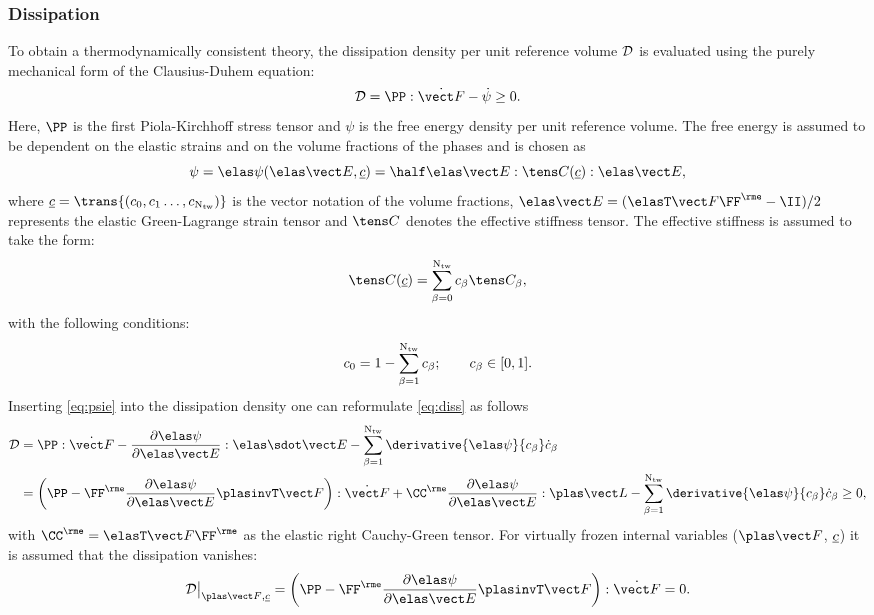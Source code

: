 \subsubsection{Dissipation} \label{sec:dissipation}
  To obtain a thermodynamically consistent theory, the  dissipation density per unit reference volume $\mathcal{D}$ is evaluated using the purely mechanical form of the Clausius-Duhem equation:
  \begin{equation}
      \diss = \PP : \FFdot - \psidot \geq 0.
      \label{eq:diss}
  \end{equation}
  Here, $\PP$ is the first Piola-Kirchhoff stress tensor and $\psi$ is the free energy density per unit reference volume. The free energy is assumed to be dependent on the elastic strains and on the volume fractions of the phases and is chosen as
  \begin{equation}
    \psi = \psie(\EEe, \cu)= \half \EEe : \CCCC(\cu) : \EEe,
    \label{eq:psie}
  \end{equation}
  where $\cu=\trans{(c_0, c_1 \ldots, c_{\Ntw})}$ is the vector notation of the volume fractions, \mbox{$\EEe=(\FFeT\FFe-\II)/2$} represents the elastic Green-Lagrange strain tensor and $\CCCC$ denotes the effective stiffness tensor.
  The effective stiffness is assumed to take the form:
  \begin{equation}
    \CCCC(\cu) = \sumbONtw \cb \CCCCb,
    \label{eq:CCCC}
  \end{equation}
  with the following conditions:
  \begin{equation}
    c_0 = 1- \sum_{\beta=1}^{{\rm N_{tw}}} c_{\beta}; \qquad c_{\beta} \in [0,1].
    \label{eq:c_constraints}
  \end{equation}
  Inserting \cref{eq:psie} into the dissipation density one can reformulate \cref{eq:diss} as follows
  \begin{equation}
    \begin{split}
      \diss &= \PP : \FFdot - \dpsieDEe : \EEedot - \sumbNtw \derivative{\psie}{\cb}\cbdot\\ 
      & = \left( \PP - \FFe \dpsieDEe \FFpinvT \right) : \FFdot + \CCe \dpsieDEe : \LLp - \sumbNtw \derivative{\psie}{\cb}\cbdot \geq 0,
    \end{split}
    \label{eq:diss2}
  \end{equation}
  with $\CCe=\FFeT\FFe$ as the elastic right Cauchy-Green tensor. For virtually frozen internal variables ($\FFp$, $\underline{c}$) it is assumed that the dissipation vanishes:
  \begin{equation}
      \disse = \left( \PP - \FFe \dpsieDEe \FFpinvT \right) : \FFdot = 0.
  \end{equation}
